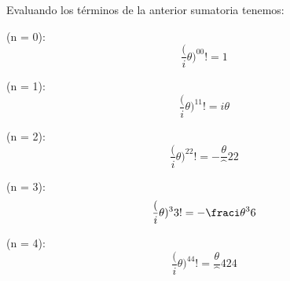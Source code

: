 \documentclass[preview]{standalone}
\begin{document}
\begin{center}
Evaluando los términos de la anterior sumatoria tenemos:

(n = 0):
$$ \frac(i\theta)^00! = 1 $$

(n = 1):
$$ \frac(i\theta)^11! = i\theta $$

(n = 2):
$$ \frac(i\theta)^22! = -\frac\theta^22 $$

(n = 3):
$$ \frac(i\theta)^33! = -\fraci\theta^36 $$

(n = 4):
$$ \frac(i\theta)^44! = \frac\theta^424 $$
\end{center}
\end{document}
